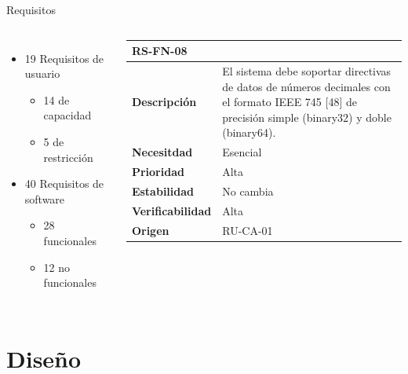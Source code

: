 \documentclass{beamer}
\begin{document}
    \begin{frame}{Requisitos}
        \begin{columns}
            \begin{itemize}
                \item 19 Requisitos de usuario
                \begin{itemize}
                    \item 14 de capacidad
                    \item 5 de restricción
                \end{itemize}
                \item 40 Requisitos de software
                \begin{itemize}
                    \item 28 funcionales
                    \item 12 no funcionales
                \end{itemize}
            \end{itemize}

            \vspace{2mm}
            \begin{adjustbox}{max width=\textwidth}
                \begin{tabular}{@{}>{\bfseries}lp{8.1cm}@{}}
                    \toprule
                    RS-FN-08 & \\
                    \midrule
                    Descripción & El sistema debe soportar directivas de datos de números decimales con el formato IEEE 745 [48] de precisión simple (binary32) y doble (binary64). \\
                    Necesitdad & Esencial \\
                    Prioridad & Alta \\
                    Estabilidad & No cambia \\
                    Verificabilidad & Alta \\
                    Origen & RU-CA-01 \\
                    \bottomrule
                \end{tabular}
            \end{adjustbox}
        \end{columns}
    \end{frame}

    \section{Diseño}
\end{document}
